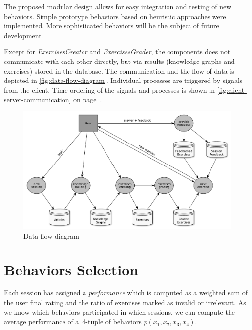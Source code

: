 \documentclass[12pt, twoside]{fithesis2}
\renewcommand{\_}{\leavevmode \kern0.07em\vbox{\hrule width0.4em}}
\begin{document}
The proposed modular design allows for easy integration and testing of new behaviors.
Simple prototype behaviors based on heuristic approaches were implemented.
More sophisticated behaviors will be the subject of future development.

Except for \textit{ExercisesCreator} and \textit{ExercisesGrader},
the components does not communicate with each other directly,
but via results (knowledge graphs and exercises) stored in the database.
The communication and the flow of data is depicted in \autoref{fig:data-flow-diagram}.
Individual processes are triggered by signals from the client.
Time ordering of the signals and processes is shown in \autoref{fig:client-server-communication}
on page~\pageref{fig:client-server-communication}.

\begin{figure}[h]
  \centering
  \includegraphics[width=\textwidth]{images/data-flow-diagram.pdf}
  \caption{Data flow diagram}
  \label{fig:data-flow-diagram}
\end{figure}

\section{Behaviors Selection}
\label{sec:smartoo-behaviors-selection}

Each session has assigned a \textit{performance} which is computed as a weighted sum of the user final rating and the ratio of exercises marked as invalid or irrelevant.
As we know which behaviors participated in which sessions, we can compute the average performance of a~4-tuple of behaviors $p(x_1, x_2, x_3, x_4)$.
\end{document}
